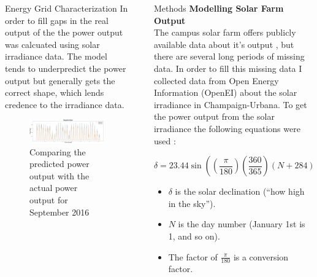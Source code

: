 \documentclass[final]{beamer}
\newlength{\sepwid}
\newlength{\onecolwid}
\newlength{\threecolwid}
\begin{document}
\begin{frame}[t]
\begin{columns}[t,totalwidth=\threecolwid]
\begin{column}{\onecolwid}
\begin{block}{Energy Grid Characterization}
In order to fill gaps in the real output of the the power output was calcuated using solar irradiance data. The model tends to underpredict the power output but generally gets the correct shape, which lends credence to the irradiance data.
\begin{figure}[H]
	\centering
	\label{fig:model-comparison}
	\includegraphics[width=\linewidth]{../figures/september_model_comparison.png}
	\caption{Comparing the predicted power output with the actual power output for September 2016}
\end{figure}

\end{block}

\end{column} %

\begin{column}{\sepwid}\end{column} %

\begin{column}{\onecolwid} %

\begin{block}{Methods}
\vspace{0.7em}
\textbf{Modelling Solar Farm Output}\\
The campus solar farm offers publicly available data about it's output \cite{alsoenergy_university_2019}, but there are several
long periods of missing data. In order to fill this missing data I collected data from Open Energy 
Information (OpenEI) \cite{noauthor_national_nodate} about the solar irradiance in Champaign-Urbana.
To get the power output from the solar irradiance the following equations were used \cite{garcia_nuclear_2015}: 

\begin{equation}
 \delta = 23.44\sin\left(\left(\frac{\pi}{180}\right)\left(\frac{360}{365}\right)(N+284)\right) \text{ } \left[degrees \right]	
\end{equation}
\small{\begin{itemize}
 	\item $\delta$ is the solar declination (``how high in the sky'').
 	\item $N$ is the day number (January 1st is 1, and so on).
 	\item The factor of $\frac{\pi}{180}$ is a conversion factor.
 \end{itemize} }



\end{block}
\end{column}
\end{columns}
\end{frame}
\end{document}
